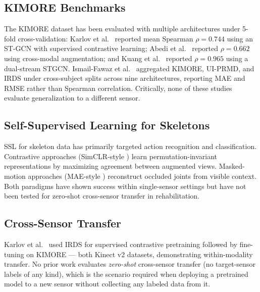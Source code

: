 \documentclass[10pt,journal]{IEEEtran}
\begin{document}
\subsection{KIMORE Benchmarks}
The KIMORE dataset \cite{capecci2019kimore} has been evaluated with multiple architectures under 5-fold cross-validation: Karlov et al.\ \cite{karlov2024} reported mean Spearman $\rho = 0.744$ using an ST-GCN with supervised contrastive learning; Abedi et al.\ \cite{abedi2023} reported $\rho = 0.662$ using cross-modal augmentation; and Kuang et al.\ \cite{kuang2026} reported $\rho = 0.965$ using a dual-stream STGCN. Ismail-Fawaz et al.\ \cite{rehabpile2026} aggregated KIMORE, UI-PRMD, and IRDS under cross-subject splits across nine architectures, reporting MAE and RMSE rather than Spearman correlation. Critically, none of these studies evaluate generalization to a different sensor.

\subsection{Self-Supervised Learning for Skeletons}
SSL for skeleton data has primarily targeted action recognition and classification. Contrastive approaches (SimCLR-style \cite{chen2020simclr}) learn permutation-invariant representations by maximizing agreement between augmented views. Masked-motion approaches (MAE-style \cite{he2022mae}) reconstruct occluded joints from visible context. Both paradigms have shown success within single-sensor settings but have not been tested for zero-shot cross-sensor transfer in rehabilitation.

\subsection{Cross-Sensor Transfer}
Karlov et al.\ \cite{karlov2024} used IRDS for supervised contrastive pretraining followed by fine-tuning on KIMORE --- both Kinect v2 datasets, demonstrating within-modality transfer. No prior work evaluates \emph{zero-shot} cross-sensor transfer (no target-sensor labels of any kind), which is the scenario required when deploying a pretrained model to a new sensor without collecting any labeled data from it.
\end{document}
